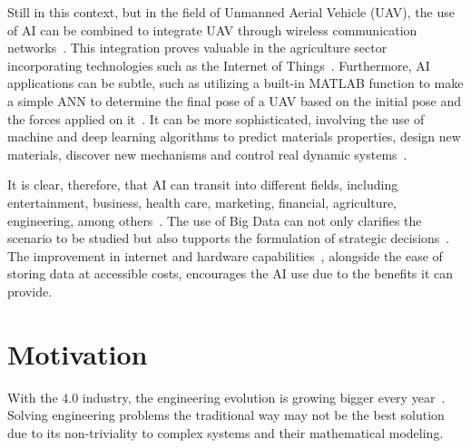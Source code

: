 Still in this context, but in the field of Unmanned Aerial Vehicle (UAV), the use of AI can be combined to integrate UAV through wireless communication networks~\cite{lahmeri2021}. This integration proves valuable in the agriculture sector~\cite{ahirwar2019} incorporating technologies such as the Internet of Things~\cite{verdouw2016,tzounis2017}.
Furthermore, AI applications can be subtle, such as utilizing a built-in MATLAB function to make a simple ANN to determine the final pose of a UAV based on the initial pose and the forces applied on it~\cite{geronel2023}. It can be more sophisticated, involving the use of machine and deep learning algorithms to predict materials properties, design new materials, discover new mechanisms and control real dynamic systems~\cite{guo2021,assilian1974}.

It is clear, therefore, that AI can transit into different fields, including entertainment, business, health care, marketing, financial, agriculture, engineering, among others~\cite{ruiz-real2020,yu2018,davenport2019,verma2021,mhlanga2020,pannu2015,ghatrehsamani2023}. 
The use of Big Data can not only clarifies the scenario to be studied but also tupports the formulation of strategic decisions~\cite{jeble2018,koscielniak2015}.
The improvement in internet and hardware capabilities~\cite{baji2018}, alongside the ease of storing data at accessible costs, encourages the AI use due to the benefits it can provide.

\section{Motivation}

With the 4.0 industry, the engineering evolution is growing bigger every year~\cite{meindl2021}.
Solving engineering problems the traditional way may not be the best solution due to its non-triviality to complex systems and their mathematical modeling.


